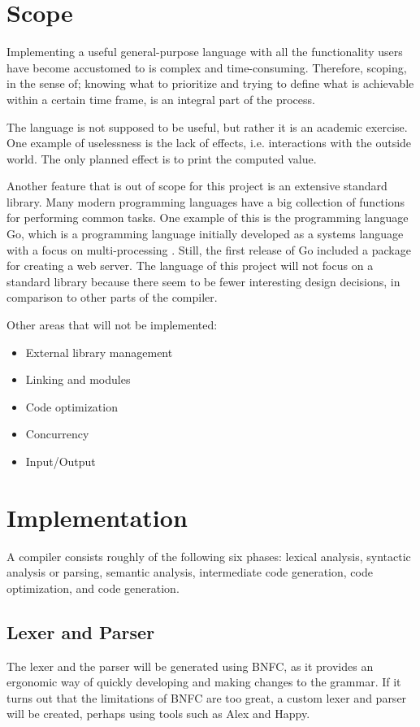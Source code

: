 \documentclass[12pt,a4paper]{article}
\begin{document}
\section{Scope}
Implementing a useful general-purpose language with all the functionality users have become accustomed to is complex and time-consuming. 
Therefore, scoping, in the sense of; knowing what to prioritize and trying to define what is achievable within a certain time frame, is an integral part of the process.

The language is not supposed to be useful, but rather it is an academic exercise. One example of uselessness is the lack of effects, i.e. interactions with the outside world. The only planned effect is to print the computed value.

Another feature that is out of scope for this project is an extensive standard library. 
Many modern programming languages have a big collection of functions for performing common tasks. 
One example of this is the programming language Go,
which is a programming language initially developed as a systems language with a focus on multi-processing \cite{go}. Still, the first release of Go included a package for creating a web server. 
The language of this project will not focus on a standard library because there seem to be fewer interesting design decisions, in comparison to other parts of the compiler.   


Other areas that will not be implemented:
\begin{itemize}
    \item External library management
    \item Linking and modules
    \item Code optimization
    \item Concurrency
    \item Input/Output
\end{itemize}

\newpage

\section{Implementation}
A compiler consists roughly of the following six phases: lexical analysis, syntactic analysis or parsing,
semantic analysis, intermediate code generation, code optimization, and code generation.

\subsection{Lexer and Parser}
The lexer and the parser will be generated using BNFC, as it provides an ergonomic way of quickly developing and making
changes to the grammar.  If it turns out that the limitations of BNFC are too great, a custom lexer and parser will be
created, perhaps using tools such as Alex and Happy.
\end{document}

